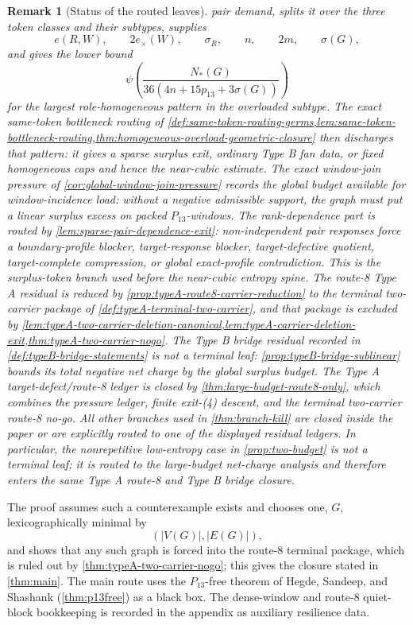\documentclass[11pt]{article}
\newtheorem{remark}[theorem]{Remark}
\begin{document}
\begin{remark}[Status of the routed leaves]
pair demand, splits it over the three token classes and their subtypes,
supplies
\[
e(R,W),\qquad 2e_\times(W),\qquad \sigma_R,\qquad n,\qquad 2m,\qquad \sigma(G),
\]
and gives the lower bound
\[
\psi\!\left(
\frac{N_*(G)}
{36(4n+15p_{13}+3\sigma(G))}
\right)
\]
for the largest role-homogeneous pattern in the overloaded subtype.  The exact
same-token bottleneck routing of
\cref{def:same-token-routing-germs,lem:same-token-bottleneck-routing,thm:homogeneous-overload-geometric-closure}
then discharges that pattern: it gives a sparse surplus exit, ordinary Type B
fan data, or fixed homogeneous caps and hence the near-cubic estimate.  The exact
window-join pressure of \cref{cor:global-window-join-pressure} records the
global budget available for window-incidence load: without a negative
admissible support, the graph must put a linear surplus excess on packed
\(P_{13}\)-windows.  The rank-dependence part is routed by
\cref{lem:sparse-pair-dependence-exit}: non-independent pair responses force a
boundary-profile blocker, target-response blocker, target-defective quotient,
target-complete compression, or global exact-profile contradiction.  This is
the surplus-token branch used before the near-cubic entropy spine.  The
route-8 Type A residual is reduced by
\cref{prop:typeA-route8-carrier-reduction} to the terminal two-carrier package
of \cref{def:typeA-terminal-two-carrier}, and that package is excluded by
\cref{lem:typeA-two-carrier-deletion-canonical,lem:typeA-carrier-deletion-exit,thm:typeA-two-carrier-nogo}.
The Type B bridge residual recorded in \cref{def:typeB-bridge-statements} is not
a terminal leaf: \cref{prop:typeB-bridge-sublinear} bounds its total negative
net charge by the global surplus budget.  The Type A target-defect/route-8
ledger is closed by \cref{thm:large-budget-route8-only}, which combines the
pressure ledger, finite exit-\textup{(4)} descent, and the terminal two-carrier
route-8 no-go.  All other branches used in \cref{thm:branch-kill} are closed
inside the paper or are explicitly routed to one of the displayed residual
ledgers.
In particular, the nonrepetitive low-entropy case in \cref{prop:two-budget} is
not a terminal leaf; it is routed to the large-budget net-charge analysis and
therefore enters the same Type A route-8 and Type B bridge closure.
\end{remark}

The proof assumes such a counterexample exists and chooses one, $G$,
lexicographically minimal by
\[
(|V(G)|,|E(G)|),
\]
and shows that any such graph is forced into the route-8 terminal package, which
is ruled out by \cref{thm:typeA-two-carrier-nogo}; this gives the closure
stated in \cref{thm:main}.  The main route uses the $P_{13}$-free theorem of
Hegde, Sandeep, and Shashank (\cref{thm:p13free}) as a black box.  The
dense-window and route-8 quiet-block bookkeeping is recorded in the appendix as
auxiliary resilience data.
\end{document}
